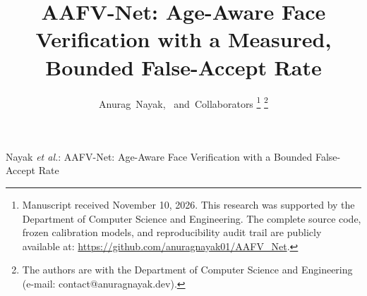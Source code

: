 \documentclass[10pt,journal,compsoc]{IEEEtran}
\begin{document}
\title{AAFV-Net: Age-Aware Face Verification with a Measured, Bounded False-Accept Rate}

\author{Anurag~Nayak,~
        and~Collaborators%
\thanks{Manuscript received November 10, 2026. This research was supported by the Department of Computer Science and Engineering. The complete source code, frozen calibration models, and reproducibility audit trail are publicly available at: \url{https://github.com/anuragnayak01/AAFV_Net}.}%
\thanks{The authors are with the Department of Computer Science and Engineering (e-mail: contact@anuragnayak.dev).}}

%
{Nayak \MakeLowercase{\textit{et al.}}: AAFV-Net: Age-Aware Face Verification with a Bounded False-Accept Rate}
\end{document}
